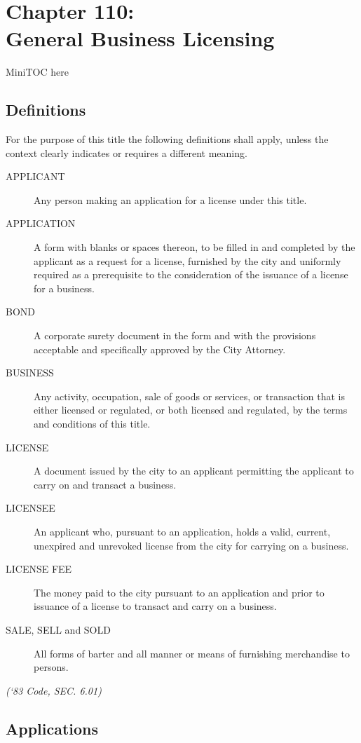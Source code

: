 %
\chapter*{Chapter 110: \\
	General Business Licensing}

MiniTOC here
\pagebreak

\section{Definitions}
For the purpose of this title the following definitions shall apply, unless the context clearly indicates or requires a different meaning.
\begin{description}
    \item[APPLICANT]  Any person making an application for a license under this title.
    \item[APPLICATION]  A form with blanks or spaces thereon, to be filled in and completed by the applicant as a request for a license, furnished by the city and uniformly required as a prerequisite to the consideration of the issuance of a license for a business.
    \item[BOND]  A corporate surety document in the form and with the provisions acceptable and specifically approved by the City Attorney.
    \item[BUSINESS]  Any activity, occupation, sale of goods or services, or transaction that is either licensed or regulated, or both licensed and regulated, by the terms and conditions of this title.
    \item[LICENSE]  A document issued by the city to an applicant permitting the applicant to carry on and transact a business.
    \item[LICENSEE]  An applicant who, pursuant to an application, holds a valid, current, unexpired and unrevoked license from the city for carrying on a business.
    \item[LICENSE FEE]  The money paid to the city pursuant to an application and prior to issuance of a license to transact and carry on a business.
    \item[SALE, SELL and SOLD]  All forms of barter and all manner or means of furnishing merchandise to persons.
\end{description}
\emph{(‘83 Code, SEC. 6.01)}

\section{Applications}



